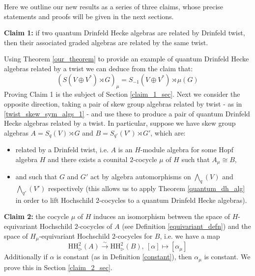 \documentclass[10pt]{article}
\newcommand{\bb}{\medbreak}
\newcommand{\nt}{\noindent}
\newcommand{\xrt}{\xrightarrow}
\newcommand{\HH}{\text{HH}}
\newcommand{\definex}[1]{\textbf{#1}}
\theoremstyle{definition}
\begin{document}
Here we outline our new results as a series of three claims, whose precise statements and proofs will be given in the next sections.\bb

\nt \definex{Claim 1:} if two quantum Drinfeld Hecke algebras are related by Drinfeld twist, then their associated graded algebras are related by the same twist.\bb

\nt Using Theorem \ref{our_theorem} to provide an example of quantum Drinfeld Hecke algebras related by a twist we can deduce from the claim that:
\begin{equation}\label{twist_skew_sym_algs_1}
(S(V\oplus V^*)\rtimes G)_\mu=S_{-1}(V\oplus V^*)\rtimes \mu(G)
\end{equation}
Proving Claim 1 is the subject of Section \ref{claim_1_sec}. Next we consider the opposite direction, taking a pair of skew group algebras related by twist - as in \eqref{twist_skew_sym_algs_1} - and use these to produce a pair of quantum Drinfeld Hecke algebras related by a twist. In particular, suppose we have skew group algebras $A=S_q(V)\rtimes G$ and $B=S_{q'}(V')\rtimes G'$, which are:
\begin{itemize}
  \item related by a Drinfeld twist, i.e. $A$ is an $H$-module algebra for some Hopf algebra $H$ and there exists a counital $2$-cocycle $\mu$ of $H$ such that $A_\mu\cong B$,
  
  \item and such that $G$ and $G'$ act by algebra automorphisms on $\bigwedge_q(V)$ and $\bigwedge_{q'}(V')$ respectively (this allows us to apply Theorem \ref{quantum_dh_alg} in order to lift Hochschild $2$-cocycles to a quantum Drinfeld Hecke algebras).
\end{itemize}


\nt \definex{Claim 2:} the cocycle $\mu$ of $H$ induces an isomorphism between the space of $H$-equivariant Hochschild $2$-cocycles of $A$ (see Definition \ref{equivariant_defn}) and the space of $H_\mu$-equivariant Hochschild $2$-cocycles for $B$, i.e. we have a map
\begin{equation}\label{cocycle_map}
\HH_\rhd^2(A)\xrt{\sim} \HH_\rhd^2(B),\ [\alpha]\mapsto [\alpha_\mu]
\end{equation}
Additionally if $\alpha$ is constant (as in Definition \ref{constant}), then $\alpha_\mu$ is constant. We prove this in Section \ref{claim_2_sec}.\bb
\end{document}
